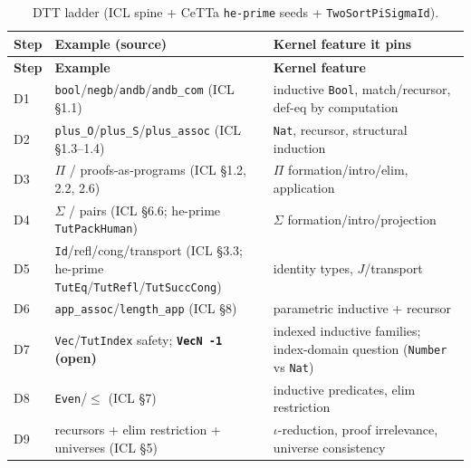 \documentclass[11pt]{article}
\newcommand{\CeTTa}{CeTTa}
\newcommand{\DTT}{DTT}
\newcommand{\code}[1]{\texttt{#1}}
\begin{document}
\begin{longtable}{@{}>{\raggedright\arraybackslash}p{}
                       >{\raggedright\arraybackslash}p{}
                       >{\raggedright\arraybackslash}p{}@{}}
\caption{\DTT{} ladder (ICL spine + \CeTTa{} \code{he-prime} seeds + \code{TwoSortPiSigmaId}).}\\
\toprule
\textbf{Step} & \textbf{Example (source)} & \textbf{Kernel feature it pins}\\
\midrule
\endfirsthead
\toprule \textbf{Step} & \textbf{Example} & \textbf{Kernel feature}\\ \midrule
\endhead
D1 & \code{bool}/\code{negb}/\code{andb}/\code{andb\_com} (ICL \S1.1) & inductive \code{Bool}, match/recursor, def-eq by computation\\
D2 & \code{plus\_O}/\code{plus\_S}/\code{plus\_assoc} (ICL \S1.3--1.4) & \code{Nat}, recursor, structural induction\\
D3 & $\Pi$ / proofs-as-programs (ICL \S1.2, 2.2, 2.6) & $\Pi$ formation/intro/elim, application\\
D4 & $\Sigma$ / pairs (ICL \S6.6; he-prime \code{TutPackHuman}) & $\Sigma$ formation/intro/projection\\
D5 & \code{Id}/refl/cong/transport (ICL \S3.3; he-prime \code{TutEq}/\code{TutRefl}/\code{TutSuccCong}) & identity types, $J$/transport\\
D6 & \code{app\_assoc}/\code{length\_app} (ICL \S8) & parametric inductive + recursor\\
D7 & \code{Vec}/\code{TutIndex} safety; \textbf{\code{VecN -1} (open)} & indexed inductive families; index-domain question (\code{Number} vs \code{Nat})\\
D8 & \code{Even}/$\le$ (ICL \S7) & inductive predicates, elim restriction\\
D9 & recursors + elim restriction + universes (ICL \S5) & $\iota$-reduction, proof irrelevance, universe consistency\\
\bottomrule
\end{longtable}
\end{document}
